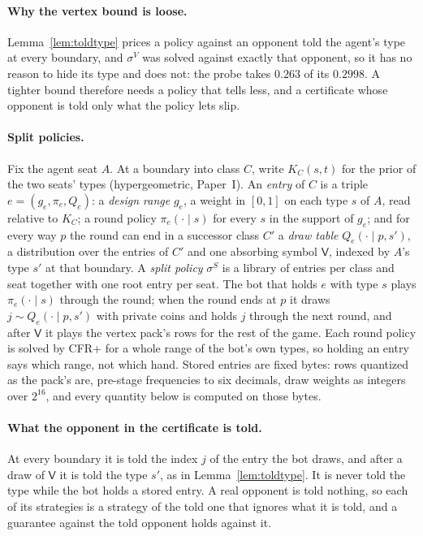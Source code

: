 \documentclass[11pt]{article}
\theoremstyle{plain}
\theoremstyle{definition}
\theoremstyle{remark}
\begin{document}
\paragraph{Why the vertex bound is loose.} Lemma~\ref{lem:toldtype}
prices a policy against an opponent told the agent's type at every
boundary, and $\sigma^{V}$ was solved against exactly that opponent, so
it has no reason to hide its type and does not: the probe takes $0.263$
of its $0.2998$. A tighter bound therefore needs a policy that tells
less, and a certificate whose opponent is told only what the policy
lets slip.

\paragraph{Split policies.} Fix the agent seat $A$. At a boundary into
class $C$, write $K_C(s,t)$ for the prior of the two seats' types
(hypergeometric, Paper~I). An \emph{entry} of $C$ is a triple
$e=(g_e,\pi_e,Q_e)$: a \emph{design range} $g_e$, a weight in $[0,1]$
on each type $s$ of $A$, read relative to $K_C$; a round policy
$\pi_e(\cdot\mid s)$ for every $s$ in the support of $g_e$; and for
every way $p$ the round can end in a successor class $C'$ a \emph{draw
table} $Q_e(\cdot\mid p,s')$, a distribution over the entries of $C'$
and one absorbing symbol $\mathsf{V}$, indexed by $A$'s type $s'$ at
that boundary. A \emph{split policy} $\sigma^{S}$ is a library of
entries per class and seat together with one root entry per seat. The
bot that holds $e$ with type $s$ plays $\pi_e(\cdot\mid s)$ through the
round; when the round ends at $p$ it draws $j\sim Q_e(\cdot\mid p,s')$
with private coins and holds $j$ through the next round, and after
$\mathsf{V}$ it plays the vertex pack's rows for the rest of the game.
Each round policy is solved by CFR+ for a whole range of the bot's own
types, so holding an entry says which range, not which hand. Stored
entries are fixed bytes: rows quantized as the pack's are, pre-stage
frequencies to six decimals, draw weights as integers over $2^{16}$,
and every quantity below is computed on those bytes.

\paragraph{What the opponent in the certificate is told.} At every
boundary it is told the index $j$ of the entry the bot draws, and after
a draw of $\mathsf{V}$ it is told the type $s'$, as in
Lemma~\ref{lem:toldtype}. It is never told the type while the bot holds
a stored entry. A real opponent is told nothing, so each of its
strategies is a strategy of the told one that ignores what it is told,
and a guarantee against the told opponent holds against it.
\end{document}
